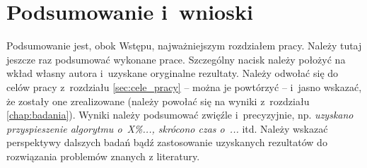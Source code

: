\chapter{Podsumowanie i~wnioski}\label{chap:podsumowanie}
Podsumowanie jest, obok Wstępu, najważniejszym rozdziałem pracy. Należy tutaj
jeszcze raz podsumować wykonane prace. Szczególny nacisk należy położyć na wkład
własny autora i~uzyskane oryginalne rezultaty. Należy odwołać się do celów pracy
z~rozdziału \ref{sec:cele_pracy} -- można je powtórzyć -- i~jasno wskazać, że
zostały one zrealizowane (należy powołać się na wyniki z~rozdziału
\ref{chap:badania}). Wyniki należy podsumować zwięźle i~precyzyjnie, np.
\textit{uzyskano przyspieszenie algorytmu o~X\%..., skrócono czas o~...}  itd.
Należy wskazać perspektywy dalszych badań bądź zastosowanie uzyskanych
rezultatów do rozwiązania problemów znanych z literatury.

